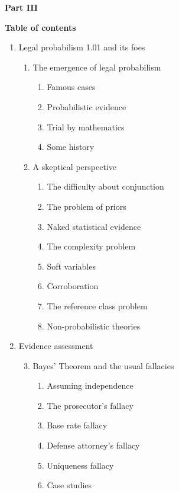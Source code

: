 \documentclass[10pt,dvipsnames,enabledeprecatedfontcommands]{scrartcl}
\begin{document}
\vspace{3mm}

\noindent \textbf{Part III}

\vspace{3mm}

\noindent \textbf{Table of contents}

\renewcommand{\labelenumi}{\Roman{enumi}}
\renewcommand{\labelenumii}{\arabic{enumii}}
\renewcommand{\labelenumiii}{\arabic{enumii}.\arabic{enumiii}}

\begin{enumerate}
\item Legal probabilism 1.01 and its foes
\begin{enumerate}

  \item The emergence of legal probabilism
  \begin{enumerate}
  \item  Famous cases
  \item  Probabilistic evidence
  \item  Trial by mathematics
  \item  Some history
  \end{enumerate}
  

  
  \item  A skeptical perspective
  \begin{enumerate}
  \item  The difficulty about conjunction
  \item  The problem of priors
  \item  Naked statistical evidence
  \item  The complexity problem
  \item  Soft variables
  \item  Corroboration
  \item  The reference class problem
  \item  Non-probabilistic theories
  \end{enumerate}


\end{enumerate}
\item  Evidence assessment


\begin{enumerate}


\setcounter{enumii}{2}
  \item  Bayes' Theorem and the usual fallacies
  \begin{enumerate}
  \item  Assuming independence
  \item  The prosecutor's fallacy
  \item  Base rate fallacy
  \item  Defense attorney's fallacy
  \item  Uniqueness fallacy
  \item  Case studies
  \end{enumerate}


\end{enumerate}
\end{enumerate}
\end{document}
